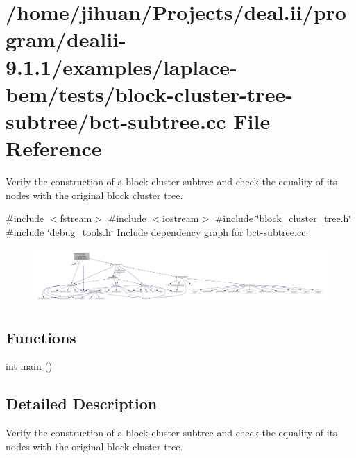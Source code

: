 \hypertarget{bct-subtree_8cc}{}\section{/home/jihuan/\+Projects/deal.ii/program/dealii-\/9.1.1/examples/laplace-\/bem/tests/block-\/cluster-\/tree-\/subtree/bct-\/subtree.cc File Reference}
\label{bct-subtree_8cc}


Verify the construction of a block cluster subtree and check the equality of its nodes with the original block cluster tree.  


{\ttfamily \#include $<$fstream$>$}\newline
{\ttfamily \#include $<$iostream$>$}\newline
{\ttfamily \#include \char`\"{}block\+\_\+cluster\+\_\+tree.\+h\char`\"{}}\newline
{\ttfamily \#include \char`\"{}debug\+\_\+tools.\+h\char`\"{}}\newline
Include dependency graph for bct-\/subtree.cc\+:\nopagebreak
\begin{figure}[H]
\begin{center}
\leavevmode
\includegraphics[width=350pt]{bct-subtree_8cc__incl}
\end{center}
\end{figure}
\subsection*{Functions}
\begin{DoxyCompactItemize}
\item 
int \hyperlink{bct-subtree_8cc_ae66f6b31b5ad750f1fe042a706a4e3d4}{main} ()
\end{DoxyCompactItemize}


\subsection{Detailed Description}
Verify the construction of a block cluster subtree and check the equality of its nodes with the original block cluster tree. 


